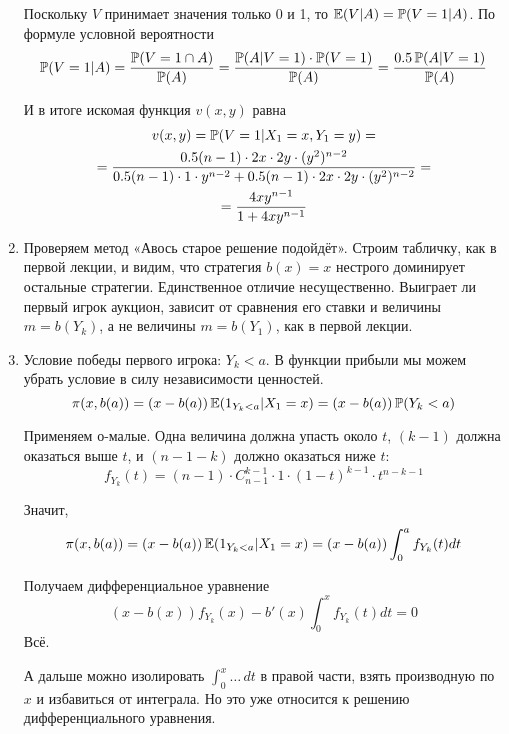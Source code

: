 \begin{enumerate}
Поскольку $ V $ принимает значения только 0 и 1, то $ \E(V|A)=\P(V=1|A) $. По формуле условной вероятности
\begin{equation}
\P(V=1|A)=\frac{\P(V=1 \cap A)}{\P(A)}=\frac{\P(A|V=1)\cdot \P(V=1)}{\P(A)}=\frac{0.5\P(A|V=1)}{\P(A)}
\end{equation}

И в итоге искомая функция $ v(x,y) $ равна
\begin{multline}
v(x,y)=\P(V=1|X_{1}=x,Y_{1}=y)=\\
=\frac{0.5(n-1)\cdot 2x \cdot 2y\cdot (y^{2})^{n-2}}{0.5(n-1)\cdot 1 \cdot y^{n-2}+0.5(n-1)\cdot 2x \cdot 2y \cdot (y^{2})^{n-2}}=\\
=\frac{4xy^{n-1}}{1+4xy^{n-1}}
\end{multline}

\item Проверяем метод «Авось старое решение подойдёт». Строим табличку, как в первой лекции, и видим, что стратегия $ b(x)=x $ нестрого доминирует остальные стратегии. Единственное отличие несущественно. Выиграет ли первый игрок аукцион, зависит от сравнения его ставки и величины $m=b(Y_{k}) $, а не величины $m=b(Y_{1}) $, как в первой лекции.


\item Условие победы первого игрока: $ Y_{k}<a $. В функции прибыли мы можем убрать условие в силу независимости ценностей.
\begin{equation}
\pi(x,b(a))=(x-b(a))\E(1_{Y_{k}<a}|X_{1}=x)=(x-b(a))\P(Y_{k}<a)
\end{equation}

Применяем о-малые. Одна величина должна упасть около $ t $, $ (k-1) $ должна оказаться выше $ t $, и $ (n-1-k) $ должно оказаться ниже $ t $:
\begin{equation}
f_{Y_{k}}(t)=(n-1)\cdot C_{n-1}^{k-1}\cdot 1\cdot (1-t)^{k-1}\cdot t^{n-k-1}
\end{equation}

Значит,
\begin{equation}
\pi(x,b(a))=(x-b(a))\E(1_{Y_{k}<a}|X_{1}=x)=(x-b(a))\int_{0}^{a}f_{Y_{k}}(t)dt
\end{equation}

Получаем дифференциальное уравнение
\begin{equation}
(x-b(x))f_{Y_{k}}(x)-b'(x)\int_{0}^{x}f_{Y_{k}}(t)dt=0
\end{equation}
Всё.

А дальше можно изолировать $ \int_{0}^{x}\ldots\, dt $ в правой части, взять производную по $ x $ и избавиться от интеграла. Но это уже относится к решению дифференциального уравнения.



\end{enumerate}
